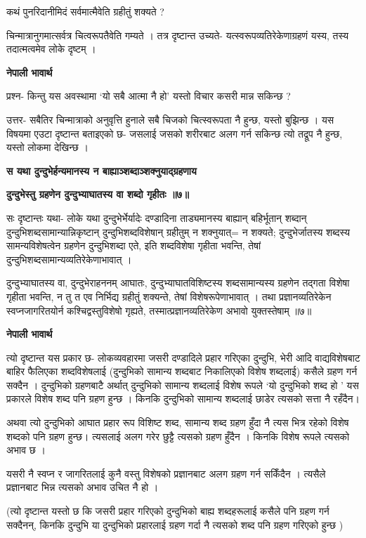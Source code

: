 \documentclass[11pt, a5paper]{article}
\begin{document}
कथं पुनरिदानीमिदं सर्वमात्मैवेति ग्रहीतुं शक्यते ?

चिन्मात्रानुगमात्सर्वत्र चित्वरूपतैवेति गम्यते । तत्र दृष्टान्त उच्यते- यत्स्वरूपव्यतिरेकेणाग्रहणं यस्य, तस्य तदात्मत्वमेव लोके दृष्टम् ।

\textbf{नेपाली भावार्थ}

प्रश्न- किन्तु यस अवस्थामा ‘यो सबै आत्मा नै हो’ यस्तो विचार कसरी मान्न सकिन्छ ?

उत्तर- सबैतिर चिन्मात्राको अनुवृत्ति हुनाले सबै चिजको चित्स्वरूपता नै हुन्छ,  यस्तो बुझिन्छ । यस विषयमा एउटा दृष्टान्त बताइएको छ- जसलाई जसको शरीरबाट अलग गर्न सकिन्छ त्यो तद्रूप नै हुन्छ, यस्तो लोकमा देखिन्छ ।

\textbf{स यथा दुन्दुभेर्हन्यमानस्य न बाह्याञ्शब्दाञ्शक्नुयाद्‍ग्रहणाय}

\textbf{दुन्दुभेस्तु ग्रहणेन दुन्दुभ्याघातस्य वा शब्दो गृहीतः ॥७॥}

सः दृष्टान्तः यथा- लोके यथा दुन्दुभेर्भेर्यादेः दण्डादिना  ताड्यमानस्य बाह्यान् बहिर्भूतान् शब्दान् दुन्दुभिशब्दसामान्यान्निकृष्टान् दुन्दुभिशब्दविशेषान् ग्रहीतुम् न शक्नुयात्= न शक्यते; दुन्दुभेर्जातस्य शब्दस्य सामन्यविशेषत्वेन ग्रहणेन दुन्दुभिशब्दा एते, इति शब्दविशेषा गृहीता भवन्ति, तेषां दुन्दुभिशब्दसामान्यव्यतिरेकेणाभावात् ।

दुन्दुभ्याघातस्य वा, दुन्दुभेराहननम् आघातः, दुन्दुभ्याघातविशिष्टस्य शब्दसामान्यस्य ग्रहणेन तद्गता विशेषा गृहीता भवन्ति, न तु त एव निर्भिद्य ग्रहीतुं शक्यन्ते, तेषां विशेषरूपेणाभावात् । तथा प्रज्ञानव्यतिरेकेन स्वप्नजागरितयोर्न कश्चिद्वस्तुविशेषो गृह्यते, तस्मात्प्रज्ञानव्यतिरेकेण अभावो युक्तस्तेषाम् ॥७॥

\textbf{नेपाली भावार्थ}

त्यो दृष्टान्त यस प्रकार छ- लोकव्यवहारमा जसरी दण्डादिले प्रहार गरिएका दुन्दुभि, भेरी आदि वाद्यविशेषबाट बाहिर फैलिएका शब्दविशेषलाई (दुन्दुभिको सामान्य शब्दबाट निकालिएको विशेष शब्दलाई) कसैले ग्रहण गर्न सक्दैन । दुन्दुभिको ग्रहणबाटै अर्थात् दुन्दुभिको सामान्य शब्दलाई विशेष रूपले ‘यो दुन्दुभिको शब्द हो ’ यस प्रकारले विशेष शब्द पनि ग्रहण हुन्छ । किनकि दुन्दुभिको सामान्य शब्दलाई छाडेर त्यसको सत्ता नै रहँदैन।

अथवा त्यो दुन्दुभिको आघात प्रहार रूप विशिष्ट शब्द, सामान्य शब्द ग्रहण हुँदा नै त्यस भित्र रहेको विशेष शब्दको पनि ग्रहण हुन्छ। त्यसलाई अलग गरेर छुट्टै त्यसको ग्रहण हुँदैन । किनकि विशेष रूपले त्यसको अभाव छ ।

यसरी नै स्वप्न र जागरितलाई कुनै वस्तु विशेषको प्रज्ञानबाट अलग ग्रहण गर्न सकिँदैन । त्यसैले प्रज्ञानबाट भिन्न त्यसको अभाव उचित नै हो ।

(त्यो दृष्टान्त यस्तो छ कि जसरी प्रहार गरिएको दुन्दुभिको बाह्य शब्दहरूलाई कसैले पनि ग्रहण गर्न सक्दैनन्, किनकि दुन्दुभि या दुन्दुभिको प्रहारलाई ग्रहण गर्दा नै त्यसको शब्द पनि ग्रहण गरिएको हुन्छ )
\end{document}
